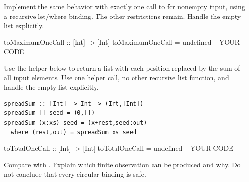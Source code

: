 Implement the same behavior with exactly one call to  for
nonempty input, using a recursive let/where binding. The other restrictions
remain. Handle the empty list explicitly.
\par\noindent\begin{minipage}{\linewidth}
\begin{codeanswer}
toMaximumOneCall :: [Int] -> [Int]
toMaximumOneCall = undefined  -- YOUR CODE
\end{codeanswer}
\end{minipage}\par
{}

Use the helper below to return a list with each position replaced by the sum of
all input elements. Use one helper call, no other recursive list function, and
handle the empty list explicitly.
\par\noindent\begin{minipage}{\linewidth}
\begin{lstlisting}
spreadSum :: [Int] -> Int -> (Int,[Int])
spreadSum [] seed = (0,[])
spreadSum (x:xs) seed = (x+rest,seed:out)
  where (rest,out) = spreadSum xs seed
\end{lstlisting}
\end{minipage}\par
\par\noindent\begin{minipage}{\linewidth}
\begin{codeanswer}
toTotalOneCall :: [Int] -> [Int]
toTotalOneCall = undefined  -- YOUR CODE
\end{codeanswer}
\end{minipage}\par
{}

Compare  with
. Explain which finite observation can be
produced and why. Do not conclude that every circular binding is safe.
